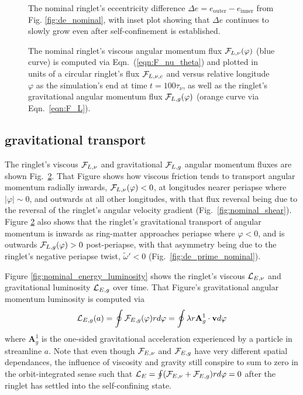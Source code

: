 \documentclass[preprint]{aastex62}
\begin{document}
\begin{figure}
    \caption{
        \label{fig:de_nominal_zoom}
        The nominal ringlet's eccentricity difference $\Delta e = e_{\text{outer}} - e_{\text{inner}}$ 
        from Fig. \ref{fig:de_nominal}, 
        with inset plot showing that $\Delta e$ continues to slowly grow even after self-confinement
        is established. 
    }
\end{figure}

\begin{figure}
    \caption{
        \label{fig:F_vs_longitude_nominal}
        The nominal ringlet's viscous angular momentum flux ${\cal F}_{L,\nu}(\varphi)$ (blue curve) is computed
        via Eqn.\ (\ref{eqn:F_nu_theta}) and plotted in units of a circular ringlet's flux ${\cal F}_{L,\nu,c}$
        and versus relative longitude $\varphi$ as the simulation's end at time $t=100\tau_\nu$, 
        as well as the ringlet's gravitational angular momentum flux ${\cal F}_{L,g}(\varphi)$
        (orange curve via Eqn.\ \ref{eqn:F_L}).
    }
\end{figure}


\subsection{gravitational transport}
\label{subsec:gravitational_flux}

The ringlet's viscous ${\cal F}_{L,\nu}$ and gravitational ${\cal F}_{L,g}$
angular momentum fluxes are shown Fig.\ \ref{fig:F_vs_longitude_nominal}. That Figure
shows how viscous friction tends to transport angular momentum radially inwards, ${\cal F}_{L,\nu}(\varphi)<0$, 
at longitudes nearer periapse where $|\varphi|\sim0$, and outwards
at all other longitudes, with that flux reversal being due to the
reversal of the ringlet's angular velocity gradient (Fig.\ \ref{fig:nominal_shear}). 
Figure \ref{fig:F_vs_longitude_nominal} also shows that the ringlet's gravitational
transport of angular momentum is inwards as
ring-matter approaches periapse where $\varphi<0$, 
and is outwards ${\cal F}_{L,g}(\varphi)>0$ post-periapse, with that asymmetry being due to the ringlet's
negative periapse twist, $\tilde{\omega}'<0$ (Fig.\ \ref{fig:de_prime_nominal}).


Figure \ref{fig:nominal_energy_luminosity} shows the ringlet's viscous ${\cal L}_{E,\nu}$ 
and gravitational luminosity ${\cal L}_{E,g}$ over time.
That Figure's gravitational angular momentum luminosity is computed via
\begin{equation}
    \label{eqn:L_g}
    {\cal L}_{E,g}(a) = \oint {\cal F}_{E,g}(\varphi)rd\varphi = \oint \lambda r\mathbf{A}^1_g\cdot\mathbf{v}d\varphi
\end{equation}
where $\mathbf{A}^1_g$ is the one-sided gravitational acceleration experienced by a particle in streamline $a$.
Note that even though ${\cal F}_{E,\nu}$ and ${\cal F}_{E,g}$ have very different spatial dependances,
the influence of viscosity and gravity still conspire to sum to zero
in the orbit-integrated sense such that ${\cal L}_{E}=\oint ({\cal F}_{E,\nu}+{\cal F}_{E,g})rd\varphi=0$ 
after the ringlet has settled into the self-confining state.
\end{document}
